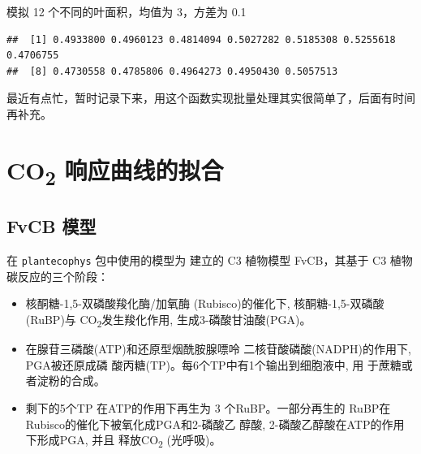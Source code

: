 \documentclass[
]{krantz}
\makeatletter
\newenvironment{Shaded}{\begin{snugshade}}{\end{snugshade}}
\newcommand{\DataTypeTok}[1]{\textcolor[rgb]{0.13,0.29,0.53}{#1}}
\newcommand{\DecValTok}[1]{\textcolor[rgb]{0.00,0.00,0.81}{#1}}
\newcommand{\FloatTok}[1]{\textcolor[rgb]{0.00,0.00,0.81}{#1}}
\newcommand{\KeywordTok}[1]{\textcolor[rgb]{0.13,0.29,0.53}{\textbf{#1}}}
\newcommand{\NormalTok}[1]{#1}
\newcommand{\OperatorTok}[1]{\textcolor[rgb]{0.81,0.36,0.00}{\textbf{#1}}}
\newcommand{\StringTok}[1]{\textcolor[rgb]{0.31,0.60,0.02}{#1}}
\newenvironment{kframe}{%
\medskip{}
\setlength{\fboxsep}{.8em}
 \def\at@end@of@kframe{}%
 \ifinner\ifhmode%
  \def\at@end@of@kframe{\end{minipage}}%
  \begin{minipage}{\columnwidth}%
 \fi\fi%
 \def\FrameCommand##1{\hskip\@totalleftmargin \hskip-\fboxsep
 \colorbox{shadecolor}{##1}\hskip-\fboxsep
     \hskip-\linewidth \hskip-\@totalleftmargin \hskip\columnwidth}%
 \MakeFramed {\advance\hsize-\width
   \@totalleftmargin\z@ \linewidth\hsize
   \@setminipage}}%
 {\par\unskip\endMakeFramed%
 \at@end@of@kframe}
\renewenvironment{Shaded}{\begin{kframe}}{\end{kframe}}
\makeatother
\begin{document}
模拟 12 个不同的叶面积，均值为 3，方差为 0.1

\begin{Shaded}
\end{Shaded}

\begin{verbatim}
##  [1] 0.4933800 0.4960123 0.4814094 0.5027282 0.5185308 0.5255618 0.4706755
##  [8] 0.4730558 0.4785806 0.4964273 0.4950430 0.5057513
\end{verbatim}

最近有点忙，暂时记录下来，用这个函数实现批量处理其实很简单了，后面有时间再补充。

\cleardoublepage

\hypertarget{response_fit}{%
\chapter{\texorpdfstring{CO\textsubscript{2} 响应曲线的拟合}{CO2 响应曲线的拟合}}\label{response_fit}}

\hypertarget{fvcb_mod}{%
\section{FvCB 模型}\label{fvcb_mod}}

在 \texttt{plantecophys} 包中使用的模型为 \citet{Farquhar1980A} 建立的 C3 植物模型 FvCB，其基于 C3 植物碳反应的三个阶段：

\begin{itemize}
\item
  核酮糖-1,5-双磷酸羧化酶/加氧酶 (Rubisco)的催化下, 核酮糖-1,5-双磷酸(RuBP)与 CO\textsubscript{2}发生羧化作用, 生成3-磷酸甘油酸(PGA)。
\item
  在腺苷三磷酸(ATP)和还原型烟酰胺腺嘌呤 二核苷酸磷酸(NADPH)的作用下, PGA被还原成磷 酸丙糖(TP)。每6个TP中有1个输出到细胞液中,
  用 于蔗糖或者淀粉的合成。
\item
  剩下的5个TP 在ATP的作用下再生为 3 个RuBP。一部分再生的 RuBP在Rubisco的催化下被氧化成PGA和2-磷酸乙 醇酸,
  2-磷酸乙醇酸在ATP的作用下形成PGA, 并且 释放CO\textsubscript{2} (光呼吸)。
\end{itemize}
\end{document}
